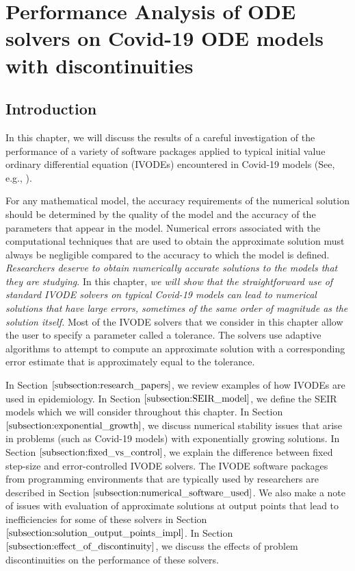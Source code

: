 \chapter{Performance Analysis of ODE solvers on Covid-19 ODE models with discontinuities}
\label{chapter:ode}
\section{Introduction}
\label{section:intro}
In this chapter, we will discuss the results of a careful investigation of the performance of a variety of software packages applied to typical initial value ordinary differential equation (IVODEs) encountered in Covid-19 models (See, e.g., \cite{MR4200336}). 

For any mathematical model, the accuracy requirements of the numerical solution should be determined by the quality of the model and the accuracy of the parameters that appear in the model. Numerical errors associated with the computational techniques that are used to obtain the approximate solution must always be negligible compared to the accuracy to which the model is defined. \emph{Researchers deserve to obtain numerically accurate solutions to the models that they are studying}. In this chapter, \emph{we will show that the straightforward use of standard IVODE solvers on typical Covid-19 models can lead to numerical solutions that have large errors, sometimes of the same order of magnitude as the solution itself.} Most of the IVODE solvers that we consider in this chapter allow the user to specify a parameter called a tolerance. The solvers use adaptive algorithms to attempt to compute an approximate solution with a corresponding error estimate that is approximately equal to the tolerance.

In Section $\ref{subsection:research_papers}$, we review examples of how IVODEs are used in epidemiology. In Section $\ref{subsection:SEIR_model}$, we define the SEIR models which we will consider throughout this chapter. In Section $\ref{subsection:exponential_growth}$, we discuss numerical stability issues that arise in problems (such as Covid-19 models) with exponentially growing solutions. In Section $\ref{subsection:fixed_vs_control}$, we explain the difference between fixed step-size and error-controlled IVODE solvers. The IVODE software packages from programming environments that are typically used by researchers are described in Section $\ref{subsection:numerical_software_used}$. We also make a note of issues with evaluation of approximate solutions at output points that lead to inefficiencies for some of these solvers in Section $\ref{subsection:solution_output_points_impl}$. In Section $\ref{subsection:effect_of_discontinuity}$, we discuss the effects of problem discontinuities on the performance of these solvers.

